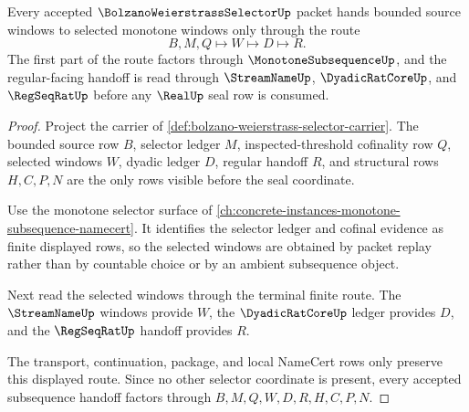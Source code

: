 \begin{theorem}
\label{thm:bolzano-weierstrass-subsequence-handoff}
Every accepted $\BolzanoWeierstrassSelectorUp$ packet hands bounded source windows to selected monotone windows only through the route
$$
B,M,Q\longmapsto W\longmapsto D\longmapsto R.
$$
The first part of the route factors through $\MonotoneSubsequenceUp$, and the regular-facing handoff is read through $\StreamNameUp$, $\DyadicRatCoreUp$, and $\RegSeqRatUp$ before any $\RealUp$ seal row is consumed.
\end{theorem}
\begin{proof}
Project the carrier of \autoref{def:bolzano-weierstrass-selector-carrier}. The bounded source row $B$, selector ledger $M$, inspected-threshold cofinality row $Q$, selected windows $W$, dyadic ledger $D$, regular handoff $R$, and structural rows $H,C,P,N$ are the only rows visible before the seal coordinate.

Use the monotone selector surface of \autoref{ch:concrete-instances-monotone-subsequence-namecert}. It identifies the selector ledger and cofinal evidence as finite displayed rows, so the selected windows are obtained by packet replay rather than by countable choice or by an ambient subsequence object.

Next read the selected windows through the terminal finite route. The $\StreamNameUp$ windows provide $W$, the $\DyadicRatCoreUp$ ledger provides $D$, and the $\RegSeqRatUp$ handoff provides $R$.

The transport, continuation, package, and local NameCert rows only preserve this displayed route. Since no other selector coordinate is present, every accepted subsequence handoff factors through $B,M,Q,W,D,R,H,C,P,N$.
\end{proof}

